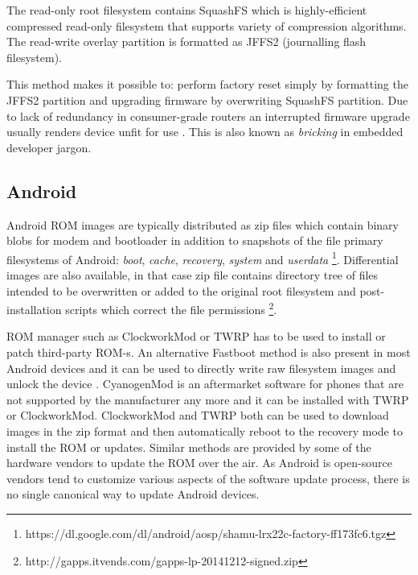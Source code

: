 \documentclass[a4paper,11pt]{kth-mag}
\begin{document}
The read-only root filesystem contains SquashFS
\cite{squashfs}
which is highly-efficient compressed read-only filesystem that
supports variety of compression algorithms.
The read-write overlay partition
is formatted as JFFS2 (journalling flash filesystem).

This method makes it possible to: perform factory reset simply by
formatting the JFFS2 partition and upgrading firmware by overwriting
SquashFS partition. Due to lack of redundancy in consumer-grade routers
an interrupted firmware upgrade usually renders device unfit for use
\cite{building-murphy-compatible-embedded-linux-systems}
\cite{safe-upgrade-of-embedded-systems}.
This is also known as \emph{bricking} in embedded developer jargon.

\subsection{Android}

Android ROM images are typically distributed as zip files which contain
binary blobs for modem and bootloader in addition to snapshots of the
file primary filesystems of Android: \emph{boot}, \emph{cache},
\emph{recovery}, \emph{system} and \emph{userdata}
\footnote{https://dl.google.com/dl/android/aosp/shamu-lrx22c-factory-ff173fc6.tgz}.
Differential images are also available, in that case zip file contains
directory tree of files intended to be overwritten or added to the original
root filesystem and post-installation scripts which correct the file permissions
\footnote{http://gapps.itvends.com/gapps-lp-20141212-signed.zip}.

ROM manager such as ClockworkMod \cite{clockworkmod} or
TWRP \cite{twrp} has to be used to install or patch
third-party ROM-s.
An alternative Fastboot method is also present in most
Android devices and it can be used to directly write raw filesystem images and
unlock the device
\cite{fastboot}.
CyanogenMod is an aftermarket software for phones that are not
supported by the manufacturer any more and it can
be installed with TWRP or ClockworkMod.
ClockworkMod and TWRP both can be used to download
images in the zip format and then
automatically reboot to the recovery mode to install the
ROM or updates.
Similar methods are provided by some of the hardware
vendors to update the ROM over the air.
As Android is open-source vendors tend to customize various aspects
of the software update process, there is no single canonical
way to update Android devices.
\end{document}
